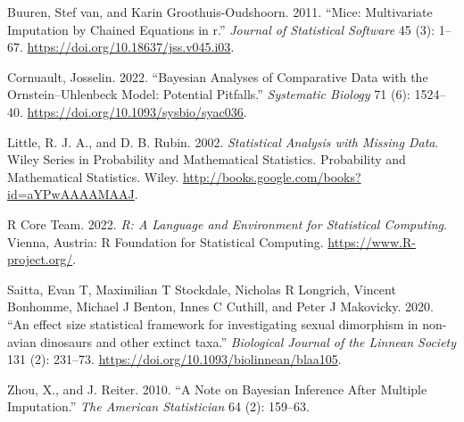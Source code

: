\documentclass[
  12pt,
]{article}
\newlength{\cslhangindent}
\newlength{\cslentryspacingunit} %
\newenvironment{CSLReferences}[2] %
 {%
  \setlength{\parindent}{0pt}
  \ifodd #1
  \let\oldpar\par
  \def\par{\hangindent=\cslhangindent\oldpar}
  \fi
  \setlength{\parskip}{#2\cslentryspacingunit}
 }%
 {}
\begin{document}
\hypertarget{refs}{}
\begin{CSLReferences}{1}{0}
\leavevmode{}%
Buuren, Stef van, and Karin Groothuis-Oudshoorn. 2011. {``Mice:
Multivariate Imputation by Chained Equations in r.''} \emph{Journal of
Statistical Software} 45 (3): 1--67.
\url{https://doi.org/10.18637/jss.v045.i03}.

\leavevmode{}%
Cornuault, Josselin. 2022. {``{Bayesian Analyses of Comparative Data
with the Ornstein--Uhlenbeck Model: Potential Pitfalls}.''}
\emph{Systematic Biology} 71 (6): 1524--40.
\url{https://doi.org/10.1093/sysbio/syac036}.

\leavevmode{}%
Little, R. J. A., and D. B. Rubin. 2002. \emph{Statistical Analysis with
Missing Data}. Wiley Series in Probability and Mathematical Statistics.
Probability and Mathematical Statistics. Wiley.
\url{http://books.google.com/books?id=aYPwAAAAMAAJ}.

\leavevmode{}%
R Core Team. 2022. \emph{R: A Language and Environment for Statistical
Computing}. Vienna, Austria: R Foundation for Statistical Computing.
\url{https://www.R-project.org/}.

\leavevmode{}%
Saitta, Evan T, Maximilian T Stockdale, Nicholas R Longrich, Vincent
Bonhomme, Michael J Benton, Innes C Cuthill, and Peter J Makovicky.
2020. {``{An effect size statistical framework for investigating sexual
dimorphism in non-avian dinosaurs and other extinct taxa}.''}
\emph{Biological Journal of the Linnean Society} 131 (2): 231--73.
\url{https://doi.org/10.1093/biolinnean/blaa105}.

\leavevmode{}%
Zhou, X., and J. Reiter. 2010. {``A Note on Bayesian Inference After
Multiple Imputation.''} \emph{The American Statistician} 64 (2):
159--63.

\end{CSLReferences}
\end{document}
